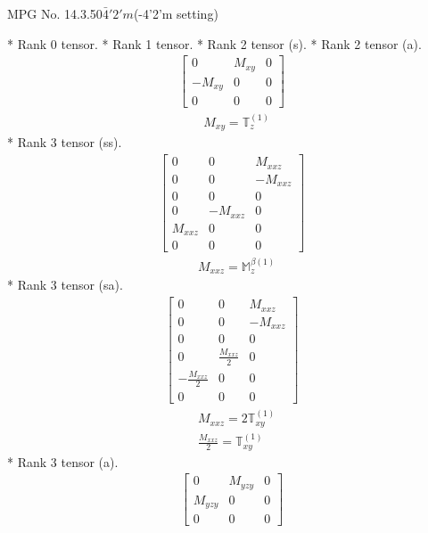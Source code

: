 \documentclass[fleqn,8pt,landscape]{jsarticle}
\begin{document}
\setcounter{MaxMatrixCols}{32}

\renewcommand{\tablename}{Table~}
\renewcommand{\figurename}{Figure~}
\begin{center}
\LARGE
MPG No. 14.3.50\quad$\bar{4}'2'm$\quad(-4'2'm setting)
\end{center}
* Rank 0 tensor.
* Rank 1 tensor.
* Rank 2 tensor (s).
* Rank 2 tensor (a).
\begin{align*}
\begin{bmatrix} 0 & M_{xy} & 0 \\ - M_{xy} & 0 & 0 \\ 0 & 0 & 0 \end{bmatrix}
\end{align*}
\begin{align*}
& M_{xy} = \mathbb{T}_{z}^{(1)}
\end{align*}
* Rank 3 tensor (ss).
\begin{align*}
\begin{bmatrix} 0 & 0 & M_{xxz} \\ 0 & 0 & - M_{xxz} \\ 0 & 0 & 0 \\ 0 & - M_{xxz} & 0 \\ M_{xxz} & 0 & 0 \\ 0 & 0 & 0 \end{bmatrix}
\end{align*}
\begin{align*}
& M_{xxz} = \mathbb{M}_{z}^{\beta(1)}
\end{align*}
* Rank 3 tensor (sa).
\begin{align*}
\begin{bmatrix} 0 & 0 & M_{xxz} \\ 0 & 0 & - M_{xxz} \\ 0 & 0 & 0 \\ 0 & \frac{M_{xxz}}{2} & 0 \\ - \frac{M_{xxz}}{2} & 0 & 0 \\ 0 & 0 & 0 \end{bmatrix}
\end{align*}
\begin{align*}
& M_{xxz} = 2 \mathbb{T}_{xy}^{(1)} \\
& \frac{M_{xxz}}{2} = \mathbb{T}_{xy}^{(1)}
\end{align*}
* Rank 3 tensor (a).
\begin{align*}
\begin{bmatrix} 0 & M_{yzy} & 0 \\ M_{yzy} & 0 & 0 \\ 0 & 0 & 0 \end{bmatrix}
\end{align*}
\end{document}
